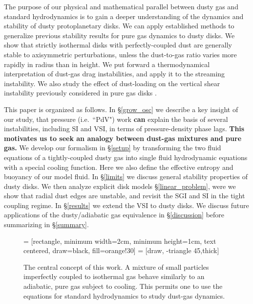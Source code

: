 \documentclass[iop, numberedappendix]{emulateapj}
\begin{document}

The purpose of our physical and mathematical parallel between
dusty gas and standard hydrodynamics is to gain a deeper understanding of the dynamics
and stability of dusty protoplanetary disks.  
We can apply established methods to generalize previous stability 
results for pure gas dynamics to dusty disks.  
We show that strictly isothermal disks with 
perfectly-coupled dust are generally 
stable to axisymmetric perturbations, unless the 
dust-to-gas ratio varies more rapidly in radius than in height.  
We put forward a thermodynamical interpretation of 
dust-gas drag instabilities, and apply it to the streaming instability.   
We also study the effect of dust-loading on the vertical shear
instability previously considered in pure gas disks
\citep[VSI,][]{nelson13,lin15,barker15}.  


This paper is organized as follows.  
In \S\ref{grow_osc} we describe a key insight of our study, that
pressure (i.e.\ ``PdV")  work {\bf can} explain the basis of several
instabilities, including SI and VSI, in terms of 
pressure-density phase lags. {\bf This motivates us to seek an 
  analogy between dust-gas mixtures and pure gas.}    
We develop our formalism in \S\ref{setup} by transforming the
two fluid equations of a tightly-coupled dusty gas into single fluid
hydrodynamic equations with a special cooling function.  Here we also
define the effective entropy and buoyancy of our model fluid. 
In \S\ref{limits} we discuss general stability properties of dusty
disks. We then analyze explicit disk models 
\S\ref{linear_problem}, were we show that radial dust edges are unstable,
and revisit the SGI and SI in the tight 
coupling regime. In \S\ref{results} we 
extend the VSI to dusty disks. We   
discuss future applications of the dusty/adiabatic gas equivalence in 
\S\ref{discussion} before summarizing in \S\ref{summary}. 


\begin{figure}
 = [rectangle, minimum width=2cm, minimum height=1cm, text centered, draw=black, fill=orange!30]
   = [draw, -triangle 45,thick]  
  \begin{center}
 \end{center}
\caption{The central concept of this work. A mixture of small particles
  imperfectly coupled to isothermal gas behave similarly to an adiabatic, pure gas
  subject to cooling.  This
  permits one to use the equations for standard hydrodynamics to study
  dust-gas dynamics. \label{concept_chart}}
\end{figure}
\end{document}
